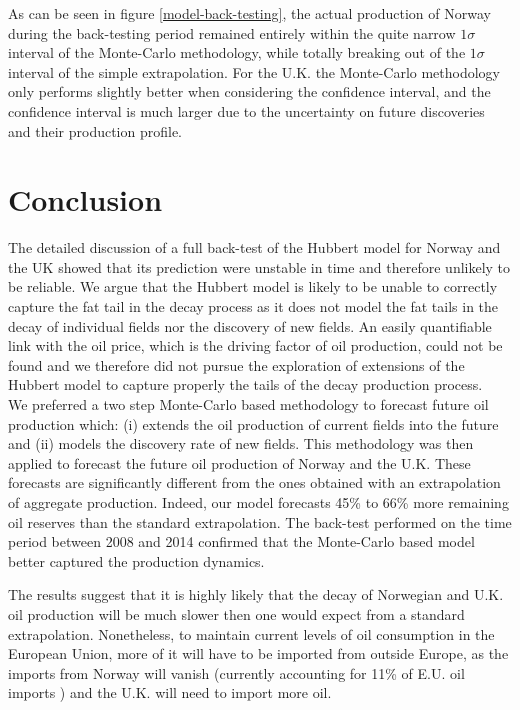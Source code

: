 \documentclass[review]{elsarticle}
\begin{document}
As can be seen in figure \ref{model-back-testing}, the actual production
of Norway during the back-testing period remained entirely within
the quite narrow $1\sigma$ interval of the Monte-Carlo methodology,
while totally breaking out of the $1\sigma$ interval of the simple
extrapolation. For the U.K. the Monte-Carlo methodology only performs
slightly better when considering the confidence interval, and the
confidence interval is much larger due to the uncertainty on future
discoveries and their production profile.


\section{Conclusion}

The detailed discussion of a full back-test of the Hubbert model for Norway and the UK showed that its prediction were unstable in time and therefore unlikely to be reliable. We argue that the Hubbert model is likely to be unable to correctly capture the fat tail in the decay process as it does not model the fat tails in the decay of individual fields nor the discovery of new fields. An easily quantifiable link with the oil price, which is the driving factor of oil production, could not be found and we therefore did not pursue the exploration of extensions of the Hubbert model to capture properly the tails of the decay production process.\\
We preferred a two step Monte-Carlo based methodology to forecast future oil production which: (i) extends the oil production of current fields into the future and (ii) models the discovery rate of new fields. This methodology was then applied to forecast the future oil production of Norway and the U.K. These forecasts are significantly different from the ones obtained with an extrapolation of aggregate production. Indeed, our model forecasts 45\% to 66\% more remaining oil reserves than the standard extrapolation. The back-test performed on the time period between 2008 and 2014 confirmed that the Monte-Carlo based model better captured the production dynamics.

The results suggest that it is highly likely that the decay
of Norwegian and U.K. oil production will be much slower then one
would expect from a standard extrapolation. Nonetheless, to maintain
current levels of oil consumption in the European Union, more of it
will have to be imported from outside Europe, as the imports from
Norway will vanish (currently accounting for 11\% of E.U. oil imports
) and the U.K. will need to import more
oil.
\end{document}
